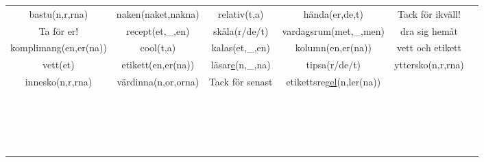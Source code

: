 \begin{center}
\begin{adjustwidth}{-2.4cm}{}
\begin{tabular}{|c c c c c c|}
            bastu(n,r,rna) & naken(naket,nakna) & relativ(t,a) & hända(er,de,t) & Tack för ikväll! &  \\
            Ta för er! & recept(et,\_,en) & skåla(r/de/t) & vardagsrum(met,\_,men) & dra sig hemåt &  \\
            komplimang(en,er(na)) & cool(t,a) & kalas(et,\_,en) & kolumn(en,er(na)) & vett och etikett &  \\
            vett(et) & etikett(en,er(na)) & läsar\underline{e}(n,\_,na) & tipsa(r/de/t) & yttersko(n,r,rna) &  \\
            innesko(n,r,rna) & värdinna(n,or,orna) & Tack för senast & etikettsreg\underline{el}(n,ler(na)) &  &  \\
             &  &  &  &  &  \\
             &  &  &  &  &  \\
             &  &  &  &  &  \\
             &  &  &  &  &  \\
             &  &  &  &  &  \\
             &  &  &  &  &  \\
             &  &  &  &  &  \\
             &  &  &  &  &  \\
             &  &  &  &  &  \\
             &  &  &  &  &  \\
             &  &  &  &  &  \\
             &  &  &  &  &  \\
             &  &  &  &  &  \\
             &  &  &  &  &  \\
             &  &  &  &  &  \\
             &  &  &  &  &  \\
             &  &  &  &  &  \\
             &  &  &  &  &  \\
            \hline
        \end{tabular}
    \end{adjustwidth}
\end{center}

